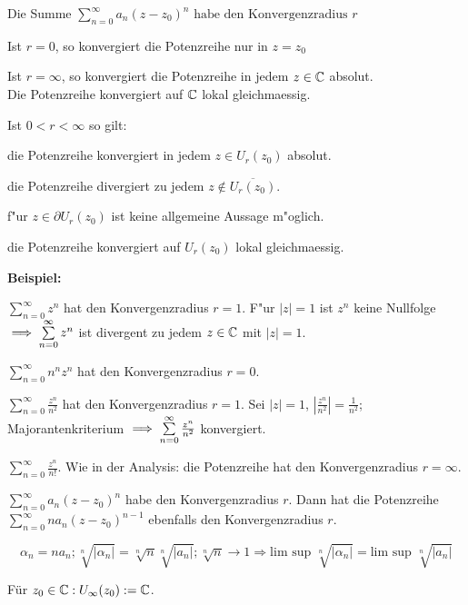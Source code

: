 \documentclass[a4paper,twoside,DIV15,BCOR12mm]{scrbook}
\begin{document}
\begin{satz}
Die Summe $  \sum\limits_{n=0}^\infty a_n(z-z_0)^n \text{ habe den Konvergenzradius } r$\\
\begin{liste}
 \item Ist $r=0$, so konvergiert die Potenzreihe nur in $z=z_0$
 \item Ist $r=\infty$, so konvergiert die Potenzreihe in jedem $z\in\mathbb{C}$ absolut. \\
  Die Potenzreihe konvergiert auf $\mathbb{C}$ lokal gleichmaessig.
 \item Ist $0<r<\infty$ so gilt: 
  \begin{liste}
   \item die Potenzreihe konvergiert in jedem $z\in U_r(z_0)$ absolut.
   \item die Potenzreihe divergiert zu jedem $z \not\in \overline{U_r(z_0)}$.
   \item f"ur $z\in \partial U_r(z_0)$ ist keine allgemeine Aussage m"oglich.
   \item die Potenzreihe konvergiert auf $U_r(z_0)$ lokal gleichmaessig.
  \end{liste}
\end{liste}
\end{satz}
\textbf{Beispiel:}\\
 \begin{liste}
  \item $ \sum\limits_{n=0}^\infty z^n $ hat den Konvergenzradius $r=1$. F"ur $|z|=1$ ist $z^n$ keine Nullfolge $ \implies \sum\limits_{n=0}^\infty z^n $ ist divergent zu jedem $z\in\mathbb{C}$ mit $|z|=1$.
  \item $ \sum\limits_{n=0}^\infty n^n z^n $ hat den Konvergenzradius $r=0$.
  \item $ \sum\limits_{n=0}^\infty \frac{z^n}{n^2}$ hat den Konvergenzradius $r=1$. Sei $|z|=1$, $|\frac{z^n}{n^2}|=\frac{1}{n^2}$; Majorantenkriterium $\implies \sum\limits_{n=0}^\infty \frac{z^n}{n^2}$ konvergiert.
  \item $ \sum\limits_{n=0}^\infty \frac{z^n}{n!}$. Wie in der Analysis: die Potenzreihe hat den Konvergenzradius $r=\infty$.
 \end{liste}

\begin{satz}
$\sum\limits_{n=0}^{\infty} a_n(z-z_0)^n$ habe den Konvergenzradius $r$. 
Dann hat die Potenzreihe $\sum\limits_{n=0}^{\infty} na_n(z-z_0)^{n-1}$ ebenfalls den Konvergenzradius $r$.
\end{satz}
\begin{beweis}
\[\alpha_n = n a_n; \sqrt[n]{|\alpha_n|} = \sqrt[n]{n}\sqrt[n]{|a_n|}; \sqrt[n]{n} \to 1 
\Rightarrow \text{lim sup } \sqrt[n]{|\alpha_n|} = \text{lim sup } \sqrt[n]{|a_n|} \]
\end{beweis}
\begin{definition}
Für $z_0 \in \mathbb{C}: U_{\infty}(z_0) := \mathbb{C}$.
\end{definition}
\end{document}
